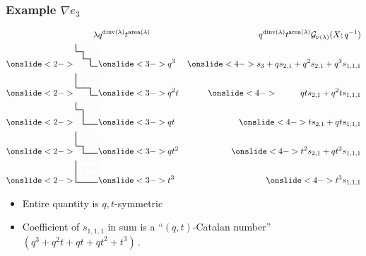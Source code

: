 \documentclass[dvipsnames,handout]{beamer}
\newcommand{\Gcal}{{\mathcal G}}
\DeclareMathOperator{\dinv}{dinv}
\DeclareMathOperator{\area}{area}
\theoremstyle{definition}
\newcounter{c}
\begin{document}
\begin{frame}
  \frametitle{Example \(\nabla e_3\)}
  \vspace{-2em}
  \begin{eqnarray*}
    \lambda
    & q^{\dinv(\lambda)}t^{\area(\lambda)}
    & q^{\dinv(\lambda)}t^{\area(\lambda)}\Gcal_{\nu(\lambda)}(X;q^{-1})\\
      \onslide<2->{\begin{tikzpicture}[xscale = 0.3,yscale = 0.3]
      \draw[step=1cm,gray!20,very thin] (0,0) grid (3,3);
      \draw[step=1cm,gray!20,very thin] (0,3)--(3,0); \draw[thick]
      (0,3)--(0,2)--(1,2)--(1,1)--(2,1)--(2,0)--(3,0);
    \end{tikzpicture}}
    & \onslide<3->{q^3}
    & \onslide<4->{s_3+qs_{2,1}+q^2s_{2,1}+q^3s_{1,1,1}}\\
    \onslide<2->
    {
    \begin{tikzpicture}[xscale = 0.3,yscale = 0.3]
      \draw[step=1cm,gray!20,very thin] (0,0) grid (3,3);
      \draw[step=1cm,gray!20,very thin] (0,3)--(3,0); \draw[thick]
      (0,3)--(0,1)--(2,1)--(2,0)--(3,0);
    \end{tikzpicture}
    }
    & \onslide<3->{q^2t}
    & \onslide<4->{\phantom{ts_{2,1}+}qts_{2,1}+q^2ts_{1,1,1}}  \\
    \onslide<2->
    {
    \begin{tikzpicture}[xscale = 0.3,yscale = 0.3]
      \draw[step=1cm,gray!20,very thin] (0,0) grid (3,3);
      \draw[step=1cm,gray!20,very thin] (0,3)--(3,0); \draw[thick]
      (0,3)--(0,2)--(1,2)--(1,0)--(3,0);
    \end{tikzpicture}
    }
    & \onslide<3->{qt}
    & \onslide<4->{ts_{2,1}+qts_{1,1,1}}\\
    \onslide<2->
    {
    \begin{tikzpicture}[xscale = 0.3,yscale = 0.3]
      \draw[step=1cm,gray!20,very thin] (0,0) grid (3,3);
      \draw[step=1cm,gray!20,very thin] (0,3)--(3,0); \draw[thick]
      (0,3)--(0,1)--(1,1)--(1,0)--(3,0);
    \end{tikzpicture}
    }
    &\onslide<3->{qt^2}
    &\onslide<4->{ t^2 s_{2,1}+qt^2s_{1,1,1}}\\
    \onslide<2->
    {
    \begin{tikzpicture}[xscale = 0.3,yscale = 0.3]
      \draw[step=1cm,gray!20,very thin] (0,0) grid (3,3);
      \draw[step=1cm,gray!20,very thin] (0,3)--(3,0); \draw[thick]
      (0,3)--(0,0)--(3,0);
    \end{tikzpicture}
    }
    &\onslide<3->{t^3}
    & \onslide<4->{t^3s_{1,1,1}}
  \end{eqnarray*}
  \vspace{-0.75em}
  \begin{itemize}
  \item<5-> Entire quantity is \(q,t\)-symmetric
  \item<6-> Coefficient of \(s_{1,1,1}\) in sum is a ``\((q,t)\)-Catalan
    number'' \((q^3+q^2t+qt+qt^2+t^3)\)\,.
  \end{itemize}
\end{frame}
\end{document}
